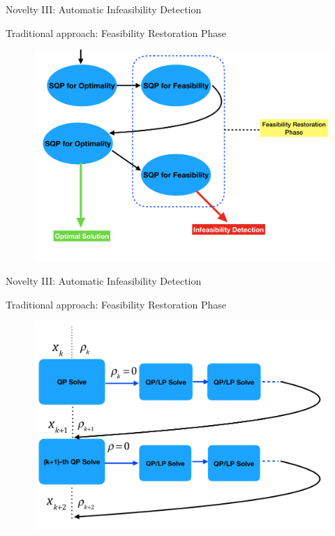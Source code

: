 \documentclass[8pt]{beamer}
\begin{document}
\begin{frame}[c]{Novelty III: Automatic Infeasibility Detection}

\vfill

{\blue 
\leftpointright Traditional approach:}  Feasibility Restoration Phase

\vfill

\begin{figure}[H]
\includegraphics[scale=0.15]{pic/feasibilityRes}
\end{figure}

\end{frame}


\begin{frame}[c]{Novelty III: Automatic Infeasibility Detection}

\vfill

{\blue 
\leftpointright Traditional approach:}  Feasibility Restoration Phase

\vfill

\begin{figure}[H]
\includegraphics[scale=0.15]{pic/feasibilityRes2}
\end{figure}

\end{frame}
\end{document}
